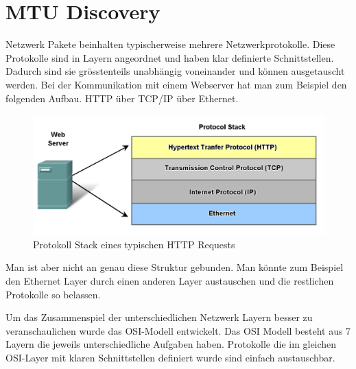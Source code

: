 \cleardoublepage
\section{MTU Discovery}

Netzwerk Pakete beinhalten typischerweise mehrere Netzwerkprotokolle. Diese Protokolle sind in Layern angeordnet und haben klar definierte Schnittstellen. Dadurch sind sie grösstenteils unabhängig voneinander und können ausgetauscht werden. Bei der Kommunikation mit einem Webserver hat man zum Beispiel den folgenden Aufbau\footnotemark[1]. HTTP über TCP/IP über Ethernet.

\begin{figure}[H]
    \begin{center}
        \includegraphics[trim=1 0 0 0,clip,width=\textwidth]{mainpart/analyse/img/HTTP_Stack}
    \end{center}
    \caption{Protokoll Stack eines typischen HTTP Requests}
\end{figure}


Man ist aber nicht an genau diese Struktur gebunden. Man könnte zum Beispiel den Ethernet Layer durch einen anderen Layer austauschen und die restlichen Protokolle so belassen.

Um das Zusammenspiel der unterschiedlichen Netzwerk Layern besser zu veranschaulichen wurde das \ac{OSI}-Modell entwickelt. Das OSI Modell besteht aus 7 Layern die jeweils unterschiedliche Aufgaben haben. Protokolle die im gleichen \ac{OSI}-Layer mit klaren Schnittstellen definiert wurde sind einfach austauschbar.

